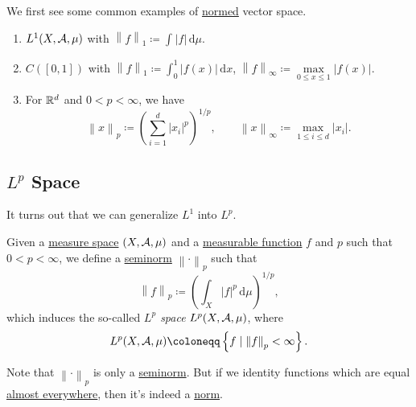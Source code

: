\begin{eg}
	We first see some common examples of \hyperref[def:norm]{normed} vector space.
	\begin{enumerate}
		\item \(L^1(X, \mathcal{\MakeUppercase{a}}  , \mu )\) with \(\left\lVert f\right\rVert _1 \coloneqq \int_{}^{} \left\vert f \right\vert  \,\mathrm{d}\mu  \).
		\item \(C([0, 1])\) with \(\left\lVert f\right\rVert _1 \coloneqq \int_{0}^{1} \left\vert f(x) \right\vert  \,\mathrm{d}x \), \(\left\lVert f\right\rVert _\infty \coloneqq \mathop{\max}\limits_{0\leq x\leq 1}\left\vert f(x) \right\vert \).
		\item For \(\mathbb{\MakeUppercase{r}} ^d\) and \(0 < p < \infty \), we have
		      \[
			      \left\lVert x\right\rVert _p \coloneqq \left(\sum\limits_{i=1}^{d} \left\vert x_{i}  \right\vert^p \right)^{1/p},\qquad \left\lVert x\right\rVert _\infty \coloneqq \mathop{\max} _{1\leq i\leq d}\left\vert x_{i}  \right\vert.
		      \]
	\end{enumerate}
\end{eg}

\subsection{\(L^{p} \) Space}
It turns out that we can generalize \hyperref[def:L1-space]{\(L^1\)} into \(L^p\).
\begin{definition}[\(L^p\) space]\label{def:L-p-space}
	Given a \hyperref[def:measure-space]{measure space} \((X, \mathcal{\MakeUppercase{a}} , \mu )\) and a \hyperref[def:measurable-function]{measurable function} \(f\) and \(p\) such that
	\(0 < p < \infty \), we define a \hyperref[def:seminorm]{seminorm} \(\left\lVert \cdot\right\rVert _p\) such that
	\[
		\left\lVert f\right\rVert _p \coloneqq \left(\int _X \left\vert f \right\vert ^p \,\mathrm{d} \mu \right)^{1/p},
	\]
	which induces the so-called \emph{\(L^p\) space} \(L^p(X, \mathcal{\MakeUppercase{a}} , \mu )\), where
	\[
		L^p(X, \mathcal{\MakeUppercase{a}} , \mu ) \coloneqq \left\{f\mid \left\lVert f\right\rVert _p < \infty \right\}.
	\]
\end{definition}
\begin{remark}
	Note that \(\left\lVert \cdot\right\rVert _p\) is only a \hyperref[def:seminorm]{seminorm}. But if we identity functions which are equal \hyperref[def:mu-almost-everywhere]{almost everywhere},
	then it's indeed a \hyperref[def:norm]{norm}.
\end{remark}


